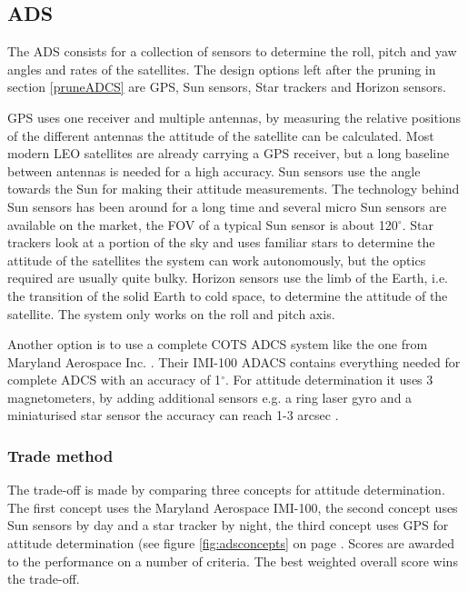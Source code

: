 \subsection{\ac{ADS}}
\label{ss:ads}
The \ac{ADS} consists for a collection of sensors to determine the roll, pitch and yaw angles and rates of the satellites. The design options left after the pruning in section \ref{pruneADCS} are \ac{GPS}, Sun sensors, Star trackers and Horizon sensors. 

\ac{GPS} uses one receiver and multiple antennas, by measuring the relative positions of the different antennas the attitude of the satellite can be calculated. Most modern \ac{LEO} satellites are already carrying a \ac{GPS} receiver, but a long baseline between antennas is needed for a high accuracy. 
Sun sensors use the angle towards the Sun for making their attitude measurements. The technology behind Sun sensors has been around for a long time and several micro Sun sensors are available on the market, the \ac{FOV} of a typical Sun sensor is about 120${}^{\circ}$. 
Star trackers look at a portion of the sky and uses familiar stars to determine the attitude of the satellites the system can work autonomously, but the optics required are usually quite bulky. 
Horizon sensors use the limb of the Earth, i.e. the transition of the solid Earth to cold space, to determine the attitude of the satellite. The system only works on the roll and pitch axis.

Another option is to use a complete \ac{COTS} \ac{ADCS} system like the one from Maryland Aerospace Inc. \cite{maryland}. Their IMI-100 ADACS contains everything needed for complete \ac{ADCS} with an accuracy of 1${}^\circ$. For attitude determination it uses 3 magnetometers, by adding additional sensors e.g. a ring laser gyro and a miniaturised star sensor the accuracy can reach 1-3 arcsec \cite{imi100}.

\subsubsection{Trade method}
The trade-off is made by comparing three concepts for attitude determination. The first concept uses the Maryland Aerospace IMI-100, the second concept uses Sun sensors by day and a star tracker by night, the third concept uses \ac{GPS} for attitude determination (see figure \ref{fig:adsconcepts} on page \pageref{fig:adsconcepts}. Scores are awarded to the performance on a number of criteria. The best weighted overall score wins the trade-off.

